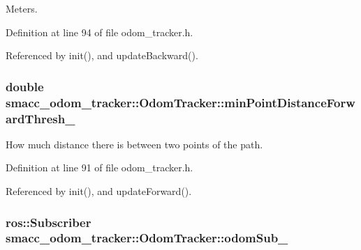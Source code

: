Meters. 



Definition at line 94 of file odom\+\_\+tracker.\+h.



Referenced by init(), and update\+Backward().

\subsubsection[{\texorpdfstring{min\+Point\+Distance\+Forward\+Thresh\+\_\+}{minPointDistanceForwardThresh_}}]{\setlength{\rightskip}{0pt plus 5cm}double smacc\+\_\+odom\+\_\+tracker\+::\+Odom\+Tracker\+::min\+Point\+Distance\+Forward\+Thresh\+\_\+\hspace{0.3cm}{\ttfamily [protected]}}\hypertarget{classsmacc__odom__tracker_1_1OdomTracker_a0017d7740d99c2cc8ba946495b96ce41}{}\label{classsmacc__odom__tracker_1_1OdomTracker_a0017d7740d99c2cc8ba946495b96ce41}


How much distance there is between two points of the path. 



Definition at line 91 of file odom\+\_\+tracker.\+h.



Referenced by init(), and update\+Forward().

\subsubsection[{\texorpdfstring{odom\+Sub\+\_\+}{odomSub_}}]{\setlength{\rightskip}{0pt plus 5cm}ros\+::\+Subscriber smacc\+\_\+odom\+\_\+tracker\+::\+Odom\+Tracker\+::odom\+Sub\+\_\+\hspace{0.3cm}{\ttfamily [protected]}}\hypertarget{classsmacc__odom__tracker_1_1OdomTracker_a901bd60f4c1d21537a160d034ff504ef}{}\label{classsmacc__odom__tracker_1_1OdomTracker_a901bd60f4c1d21537a160d034ff504ef}


